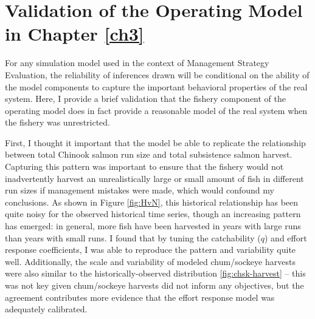\documentclass[12pt,]{book}
\theoremstyle{definition}
\theoremstyle{definition}
\theoremstyle{definition}
\theoremstyle{remark}
\begin{document}
\clearpage

\doublespacing

\chapter{Validation of the Operating Model in Chapter
\ref{ch3}}\label{appendix-b}

For any simulation model used in the context of Management Strategy
Evaluation, the reliability of inferences drawn will be conditional on
the ability of the model components to capture the important behavioral
properties of the real system. Here, I provide a brief validation that
the fishery component of the operating model does in fact provide a
reasonable model of the real system when the fishery was unrestricted.

First, I thought it important that the model be able to replicate the
relationship between total Chinook salmon run size and total subsistence
salmon harvest. Capturing this pattern was important to ensure that the
fishery would not inadvertently harvest an unrealistically large or
small amount of fish in different run sizes if management mistakes were
made, which would confound my conclusions. As shown in Figure
\ref{fig:HvN}, this historical relationship has been quite noisy for the
observed historical time series, though an increasing pattern has
emerged: in general, more fish have been harvested in years with large
runs than years with small runs. I found that by tuning the catchability
(\(q\)) and effort response coefficients, I was able to reproduce the
pattern and variability quite well. Additionally, the scale and
variability of modeled chum/sockeye harvests were also similar to the
historically-observed distribution \ref{fig:chsk-harvest} -- this was
not key given chum/sockeye harvests did not inform any objectives, but
the agreement contributes more evidence that the effort response model
was adequately calibrated.
\end{document}

